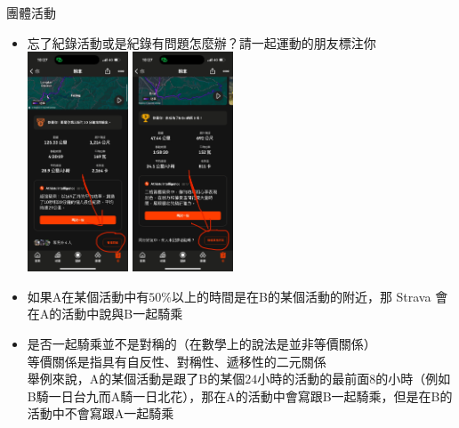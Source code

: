 \begin{frame}{團體活動}
\begin{multicols}{2}
\begin{itemize}
\item 忘了紀錄活動或是紀錄有問題怎麼辦？請一起運動的朋友標注你\\
\includegraphics[width=3cm]{rideTogether.png}
\includegraphics[width=3cm]{rideTogether2.png}\pause
\newpage
\item 如果A在某個活動中有$50\%$以上的時間是在B的某個活動的附近，那 Strava 會在A的活動中說與B一起騎乘\pause
\item 是否一起騎乘並不是對稱的（在數學上的說法是並非等價關係）\\
{\tiny 等價關係是指具有自反性、對稱性、遞移性的二元關係}\\
舉例來說，A的某個活動是跟了B的某個$24$小時的活動的最前面$8$的小時（例如B騎一日台九而A騎一日北花），那在A的活動中會寫跟B一起騎乘，但是在B的活動中不會寫跟A一起騎乘
\end{itemize}
\end{multicols}
\end{frame}

